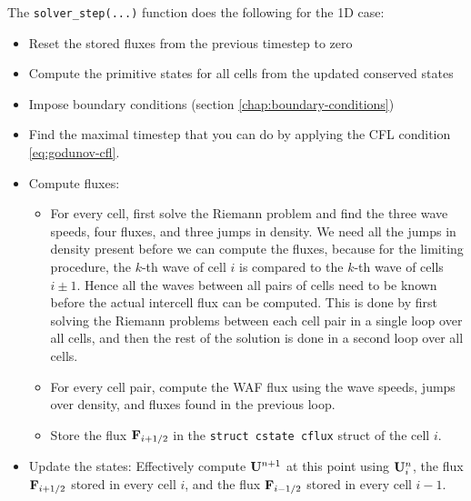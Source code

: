 The \verb|solver_step(...)| function does the following for the 1D case:
\begin{itemize}
	\item 	Reset the stored fluxes from the previous timestep to zero
	\item 	Compute the primitive states for all cells from the updated conserved states
	\item 	Impose boundary conditions (section \ref{chap:boundary-conditions})
	\item 	Find the maximal timestep that you can do by applying the CFL condition \ref{eq:godunov-cfl}.
	\item 	Compute fluxes:
	\begin{itemize}
		\item 	For every cell, first solve the Riemann problem and find the three wave speeds, four fluxes, and three jumps in density.
				We need all the jumps in density present before we can compute the fluxes, because for the limiting procedure, the $k$-th wave of cell $i$ is compared to the $k$-th wave of cells $i \pm 1$.
				Hence all the waves between all pairs of cells need to be known before the actual intercell flux can be computed.
				This is done by first solving the Riemann problems between each cell pair in a single loop over all cells, and then the rest of the solution is done in a second loop over all cells.
		\item 	For every cell pair, compute the WAF flux using the wave speeds, jumps over density, and fluxes found in the previous loop.
		\item 	Store the flux $\mathbf{F}_{i+1/2}$ in the \texttt{struct cstate cflux} struct of the cell $i$.
	\end{itemize}
	\item 	Update the states: Effectively compute $\mathbf{U}^{n+1}$ at this point using $\mathbf{U}_i^n$, the flux $\mathbf{F}_{i+1/2}$ stored in every cell $i$, and the flux $\mathbf{F}_{i-1/2}$ stored in every cell $i-1$.
\end{itemize}



